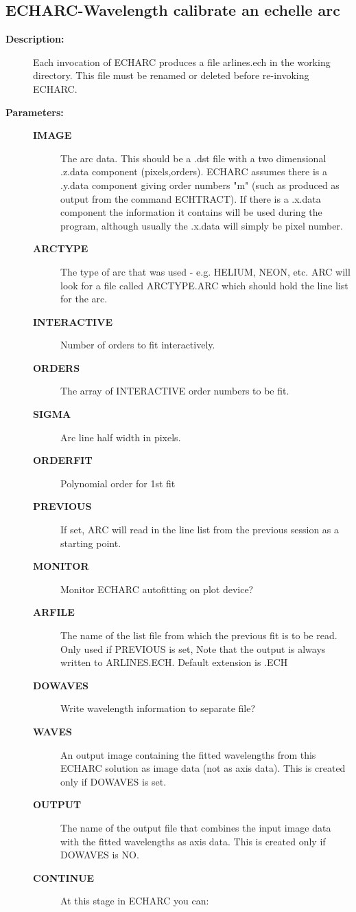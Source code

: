 \subsection{ECHARC-\label{ECHARC}Wavelength calibrate an echelle arc}
\begin{description}

\item [{\bf Description:}]
 Each invocation of ECHARC produces a file arlines.ech in the working
 directory.  This file must be renamed or deleted before re-invoking
 ECHARC.

\item [{\bf Parameters:}]
\begin{description}
\item [{\bf IMAGE}]
 The arc data.  This should be a .dst file with a two dimensional
 .z.data component (pixels,orders). ECHARC assumes there is a
 .y.data component giving order numbers "m"   (such as produced as
 output from the command ECHTRACT).  If there is a .x.data component
 the information it contains will be used during the program,
 although usually the .x.data will simply be pixel number.
\item [{\bf ARCTYPE}]
 The type of arc that was used - e.g. HELIUM, NEON, etc.  ARC will look
 for a file called ARCTYPE.ARC which should hold the line list for the
 arc.
\item [{\bf INTERACTIVE}]
 Number of orders to fit interactively.
\item [{\bf ORDERS}]
 The array of INTERACTIVE order numbers to be fit.
\item [{\bf SIGMA}]
 Arc line half width in pixels.
\item [{\bf ORDERFIT}]
 Polynomial order for 1st fit
\item [{\bf PREVIOUS}]
 If set, ARC will read in the line list from the previous
 session as a starting point.
\item [{\bf MONITOR}]
 Monitor ECHARC autofitting on plot device?
\item [{\bf ARFILE}]
 The name of the list file from which the previous fit is to be read.
 Only used if PREVIOUS is set, Note that the output is always
 written to ARLINES.ECH.  Default extension is .ECH
\item [{\bf DOWAVES}]
 Write wavelength information to separate file?
\item [{\bf WAVES}]
 An output image containing the fitted wavelengths from this ECHARC
 solution as image data (not as axis data).  This is created only if
 DOWAVES is set.
\item [{\bf OUTPUT}]
 The name of the output file that combines the input image data
 with the fitted wavelengths as axis data. This is created only
 if DOWAVES is NO.
\item [{\bf CONTINUE}]
 At this stage in ECHARC you can:


\end{description}
\end{description}
